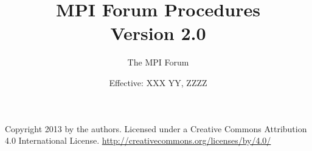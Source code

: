 \documentclass{book}
\begin{document}
\title{MPI Forum Procedures \\
Version 2.0}
\author{The MPI Forum}
\date{Effective: XXX YY, ZZZZ}

\maketitle

\null\vfill
\thispagestyle{empty}
\noindent
Copyright 2013 by the authors. Licensed under a Creative Commons Attribution
4.0 International License. \url{http://creativecommons.org/licenses/by/4.0/}






\end{document}
